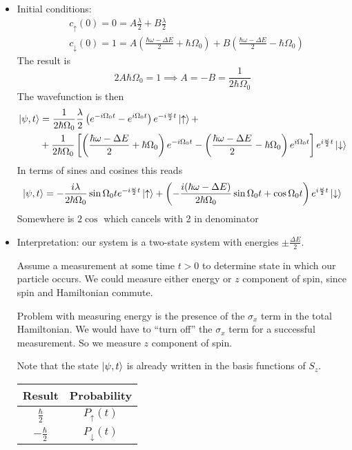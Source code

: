 \documentclass[11pt, a4paper]{article}
\newcommand{\Ham}{Hamiltonian\xspace}
\newcommand{\p}{\psi}  %
\newcommand{\ua}{\uparrow}  %
\newcommand{\da}{\downarrow}  %
\begin{document}
\begin{itemize}
	\item Initial conditions:
	\begin{align*}
		&c_{\ua}(0) = 0 = A\frac{\lambda}{2} + B\frac{\lambda}{2}\\
		&c_{\da}(0) = 1 = A\left(\frac{\hbar \omega - \Delta E}{2} + \hbar \Omega_{0}\right) + B\left(\frac{\hbar \omega - \Delta E}{2} - \hbar \Omega_{0}\right)
	\end{align*}
	The result is
	\begin{equation*}
		2A \hbar \Omega_{0} = 1 \implies A = - B = \frac{1}{2\hbar \Omega_{0}}
	\end{equation*}
	The wavefunction is then
	\begin{align*}
		\ket{\p, t} &= \frac{1}{2\hbar \Omega_{0}}\frac{\lambda}{2}\left(e^{-i \Omega_{0}t} - e^{i \Omega_{0}t} \right)e^{-i\frac{\omega}{2}t}\ket{\ua} + \\
		& + \frac{1}{2\hbar \Omega_{0}}\left[\left(\frac{\hbar \omega - \Delta E}{2} + \hbar \Omega_{0} \right)e^{-i\Omega_{0}t} - \left(\frac{\hbar \omega - \Delta E}{2} - \hbar \Omega_{0} \right)e^{i\Omega_{0}t}\right]e^{i\frac{\omega}{2}t}\ket{\da}
	\end{align*}
	In terms of sines and cosines this reads
	\begin{align*}
		\ket{\p, t} = -\frac{i\lambda}{2\hbar \Omega_{0}} \sin \Omega_{0}te^{-i\frac{\omega}{2}t}\ket{\ua} + \left( -\frac{i(\hbar \omega - \Delta E)}{2\hbar \Omega_{0}}\sin \Omega_{0}t + \cos \Omega_{0}t\right)e^{i\frac{\omega}{2}t}\ket{\da}
	\end{align*}
	Somewhere is $ 2 \cos $ which cancels with 2 in denominator
	
	\item Interpretation: our system is a two-state system with energies $ \pm \frac{\Delta E}{2} $. 
	
	Assume a measurement at some time $ t > 0 $  to determine state in which our particle occurs. We could measure either energy or $ z $ component of spin, since spin and \Ham commute. 
	
	Problem with measuring energy is the presence of the $ \sigma_{x} $ term in the total \Ham. We would have to ``turn off'' the $ \sigma_{x} $ term for a successful measurement. So we measure $ z $ component of spin. 
	
	Note that the state $ \ket{\p, t} $ is already written in the basis functions of $ S_{z} $.
	
	\begin{center}
		\begin{tabular}{c|c}
			Result & Probability \\
			\hline {\rule{0pt}{2.6ex}} \hspace{-7pt}
			 $ \frac{\hbar}{2} $ & $ P_{\ua}(t) $\\
			$ -\frac{\hbar}{2} $ & $ P_{\da}(t) $
		\end{tabular}
	\end{center}
	

\end{itemize}
\end{document}

